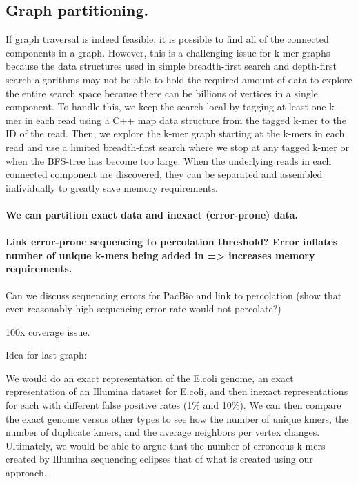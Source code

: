 \documentclass[12pt]{article} \usepackage{simplemargins}
\begin{document}
\subsection{Graph partitioning.}
If graph traversal is indeed feasible, it is possible to find all of
the connected components in a graph. However, this is a challenging
issue for k-mer graphs because the data structures used in simple
breadth-first search and depth-first search algorithms may not be able
to hold the required amount of data to explore the entire search space
because there can be billions of vertices in a single component. To
handle this, we keep the search local by tagging at least one k-mer in
each read using a C++ map data structure from the tagged k-mer to the
ID of the read. Then, we explore the k-mer graph starting at the
k-mers in each read and use a limited breadth-first search where we
stop at any tagged k-mer or when the BFS-tree has become too
large. When the underlying reads in each connected component are
discovered, they can be separated and assembled individually to
greatly save memory requirements.

\paragraph{We can partition exact data and inexact (error-prone) data.}

\paragraph{Link error-prone sequencing to percolation threshold?  Error inflates number of unique k-mers being added in => increases memory requirements.}

Can we discuss sequencing errors for PacBio and link to percolation (show
that even reasonably high sequencing error rate would not percolate?)

100x coverage issue.

Idea for last graph:

We would do an exact representation of the E.coli genome, an exact 
representation of an Illumina dataset for E.coli, and then inexact
representations for each with different false positive rates (1\% and
10\%). We can then compare the exact genome versus other types to see
how the number of unique kmers, the number of duplicate kmers, and the
average neighbors per vertex changes. Ultimately, we would be able to
argue that the number of erroneous k-mers created by Illumina
sequencing eclipses that of what is created using our approach.



\end{document}
